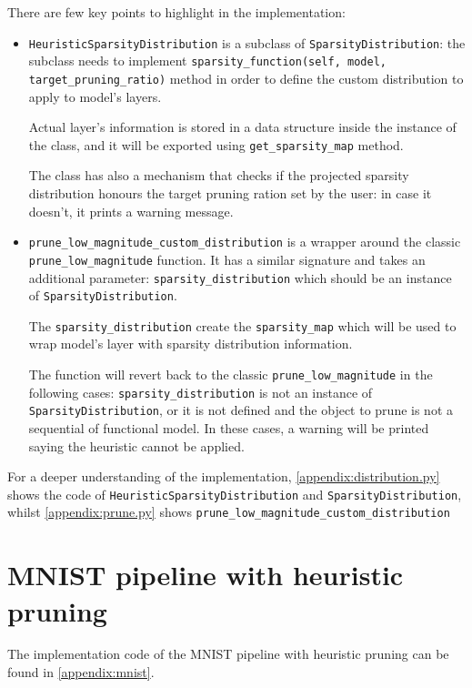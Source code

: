 There are few key points to highlight in the implementation:

\begin{itemize}
    \item \texttt{HeuristicSparsityDistribution} is a subclass of \linebreak
        \texttt{SparsityDistribution}: the subclass needs to implement
        \linebreak
        \texttt{sparsity\_function\string(self, model, target\_pruning\_ratio\string)}
        method in order to define the custom distribution to apply to model's
        layers.

        Actual layer's information is stored in a data structure inside the
        instance of the class, and it will be exported using
        \texttt{get\_sparsity\_map} method.

        The class has also a mechanism that checks if the projected sparsity
        distribution honours the target pruning ration set by the user: in case
        it doesn't, it prints a warning message.
    \item \texttt{prune\_low\_magnitude\_custom\_distribution} is a wrapper
        around the classic \texttt{prune\_low\_magnitude} function. It has a
        similar signature and takes an additional parameter:
        \texttt{sparsity\_distribution} which should be an instance of
        \texttt{SparsityDistribution}.

        The \texttt{sparsity\_distribution} create the \texttt{sparsity\_map}
        which will be used to wrap model's layer with sparsity distribution
        information.

        The function will revert back to the classic
        \texttt{prune\_low\_magnitude} in the following cases:
        \texttt{sparsity\_distribution} is not an instance of \linebreak
        \texttt{SparsityDistribution}, or it is not defined and the object to
        prune is not a sequential of functional model. In these cases, a
        warning will be printed saying the heuristic cannot be applied.
\end{itemize}

For a deeper understanding of the implementation,
\autoref{appendix:distribution.py} shows the code of
\texttt{HeuristicSparsityDistribution} and \texttt{SparsityDistribution},
whilst \autoref{appendix:prune.py} shows
\texttt{prune\_low\_magnitude\_custom\_distribution}

\section{MNIST pipeline with heuristic pruning}\label{sec:mnistpipeline}
The implementation code of the MNIST pipeline with heuristic pruning can be
found in \autoref{appendix:mnist}.

